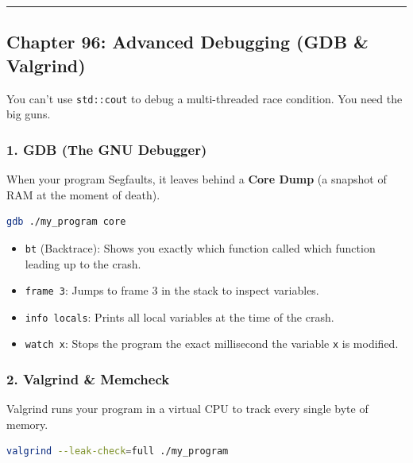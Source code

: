 \begin{center}\rule{0.5\linewidth}{0.5pt}\end{center}

\hypertarget{chapter-96-advanced-debugging-gdb-valgrind}{%
\subsection{Chapter 96: Advanced Debugging (GDB \&
Valgrind)}\label{chapter-96-advanced-debugging-gdb-valgrind}}

You can't use \passthrough{\lstinline!std::cout!} to debug a
multi-threaded race condition. You need the big guns.

\hypertarget{gdb-the-gnu-debugger}{%
\subsubsection{1. GDB (The GNU Debugger)}\label{gdb-the-gnu-debugger}}

When your program Segfaults, it leaves behind a \textbf{Core Dump} (a
snapshot of RAM at the moment of death).

\begin{lstlisting}[language=bash]
gdb ./my_program core
\end{lstlisting}

\begin{itemize}
\tightlist
\item
  \passthrough{\lstinline!bt!} (Backtrace): Shows you exactly which
  function called which function leading up to the crash.
\item
  \passthrough{\lstinline!frame 3!}: Jumps to frame 3 in the stack to
  inspect variables.
\item
  \passthrough{\lstinline!info locals!}: Prints all local variables at
  the time of the crash.
\item
  \passthrough{\lstinline!watch x!}: Stops the program the exact
  millisecond the variable \passthrough{\lstinline!x!} is modified.
\end{itemize}

\hypertarget{valgrind-memcheck}{%
\subsubsection{2. Valgrind \& Memcheck}\label{valgrind-memcheck}}

Valgrind runs your program in a virtual CPU to track every single byte
of memory.

\begin{lstlisting}[language=bash]
valgrind --leak-check=full ./my_program
\end{lstlisting}

